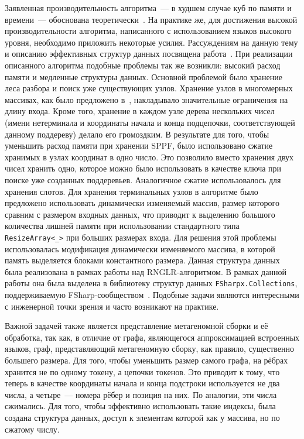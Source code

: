 Заявленная производительность алгоритма~--- в худшем случае куб по памяти и времени~--- обоснована теоретически~\cite{Johnstone201564}. На практике же, для достижения высокой производительности алгоритма, написанного с использованием языков высокого уровня, необходимо приложить некоторые усилия. Рассуждениям на данную тему и описанию эффективных структур данных посвящена работа~\cite{Johnstone2011}. При реализации описанного алгоритма подобные проблемы так же возникли: высокий расход памяти и медленные структуры данных. Основной проблемой было хранение леса разбора и поиск уже существующих узлов. Хранение узлов в многомерных массивах, как было предложено в~\cite{Johnstone2011}, накладывало значительные ограничения на длину входа. Кроме того, хранение в каждом узле дерева нескольких чисел (имени нетерминала и координаты начала и конца подцепочки, соответствующей данному поддереву) делало его громоздким. В результате для того, чтобы уменьшить расход памяти при хранении SPPF, было использовано сжатие хранимых в узлах координат в одно число. Это позволило вместо хранения двух чисел хранить одно, которое можно было использовать в качестве ключа при поиске уже созданных поддеревьев. Аналогичное сжатие использовалось для хранения слотов. Для хранения терминальных узлов в алгоритме было предложено использовать динамически изменяемый массив,  размер которого сравним с размером входных данных, что приводит к выделению большого количества лишней памяти при использовании стандартного типа \verb|ResizeArray<_>| при больших размерах входа. Для решения этой проблемы использовалась модификация динамически изменяемого массива, в которой память выделяется блоками константного размера. Данная структура данных была реализована в рамках работы над RNGLR-алгоритмом. В рамках данной работы она была выделена в библиотеку структур данных \texttt{FSharpx.Collections}, поддерживаемую FSharp-сообществом~\cite{FsharpX}. Подобные задачи являются интересными с инженерной точки зрения и часто возникают на практике.

Важной задачей также является представление метагеномной сборки и её обработка, так как, в отличие от графа, являющегося аппроксимацией встроенных языков, граф, представляющий метагеномную сборку, как правило, существенно большего размера. Для того, чтобы уменьшить размер самого графа, на рёбрах хранится не по одному токену, а цепочки токенов. Это приводит к тому, что теперь в качестве координаты начала и конца подстроки используется не два числа, а четыре~--- номера рёбер и позиция на них. По аналогии, эти числа сжимались. Для того, чтобы эффективно использовать такие индексы, была создана структура данных, доступ к элементам которой как у массива, но по сжатому числу. 

